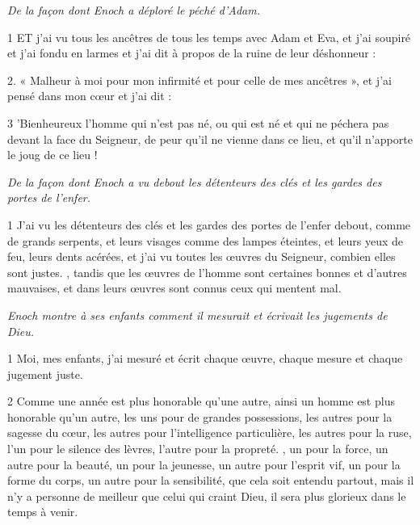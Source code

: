 
\par \textit{De la façon dont Enoch a déploré le péché d'Adam.}

\par 1 ET j'ai vu tous les ancêtres de tous les temps avec Adam et Eva, et j'ai soupiré et j'ai fondu en larmes et j'ai dit à propos de la ruine de leur déshonneur :

\par 2. « Malheur à moi pour mon infirmité et pour celle de mes ancêtres », et j'ai pensé dans mon cœur et j'ai dit :

\par 3 'Bienheureux l'homme qui n'est pas né, ou qui est né et qui ne péchera pas devant la face du Seigneur, de peur qu'il ne vienne dans ce lieu, et qu'il n'apporte le joug de ce lieu !


\par \textit{De la façon dont Enoch a vu debout les détenteurs des clés et les gardes des portes de l'enfer.}

\par 1 J'ai vu les détenteurs des clés et les gardes des portes de l'enfer debout, comme de grands serpents, et leurs visages comme des lampes éteintes, et leurs yeux de feu, leurs dents acérées, et j'ai vu toutes les œuvres du Seigneur, combien elles sont justes. , tandis que les œuvres de l'homme sont certaines bonnes et d'autres mauvaises, et dans leurs œuvres sont connus ceux qui mentent mal.


\par \textit{Enoch montre à ses enfants comment il mesurait et écrivait les jugements de Dieu.}

\par 1 Moi, mes enfants, j'ai mesuré et écrit chaque œuvre, chaque mesure et chaque jugement juste.

\par 2 Comme une année est plus honorable qu'une autre, ainsi un homme est plus honorable qu'un autre, les uns pour de grandes possessions, les autres pour la sagesse du cœur, les autres pour l'intelligence particulière, les autres pour la ruse, l'un pour le silence des lèvres, l'autre pour la propreté. , un pour la force, un autre pour la beauté, un pour la jeunesse, un autre pour l'esprit vif, un pour la forme du corps, un autre pour la sensibilité, que cela soit entendu partout, mais il n'y a personne de meilleur que celui qui craint Dieu, il sera plus glorieux dans le temps à venir.

